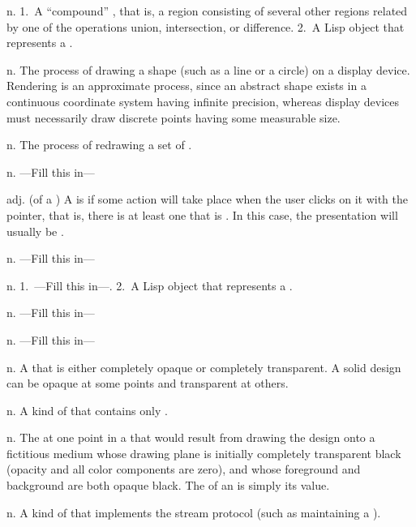 \begin{description}
 {n.} {1.~A ``compound'' , that is, a
region consisting of several other regions related by one of the operations
union, intersection, or difference.  2.~A Lisp object that represents a
.}

 {n.} {The process of drawing a shape (such as a line
or a circle) on a display device.  Rendering is an approximate process, since an
abstract shape exists in a continuous coordinate system having infinite
precision, whereas display devices must necessarily draw discrete points having
some measurable size.}

 {n.} {The process of redrawing a set of .}

 {n.} {---Fill this in---}

 {adj.} {(of a ) A
 is  if some action will take place when the
user clicks on it with the pointer, that is, there is at least one
 that is .  In this case, the
presentation will usually be .}

 {n.} {---Fill this in---}

 {n.} {1.~---Fill this in---.  2.~A Lisp object that
represents a .}

 {n.} {---Fill this in---}

 {n.} {---Fill this in---}

 {n.} {A  that is either completely
opaque or completely transparent.  A solid design can be opaque at some points
and transparent at others.}

 {n.} {A kind of  that contains only
.}

 {n.} {The  at one point in a
 that would result from drawing the design onto a fictitious medium
whose drawing plane is initially completely transparent black (opacity and all
color components are zero), and whose foreground and background are both opaque
black.  The  of an  is simply its value.}

 {n.} {A kind of  that implements the stream
protocol (such as maintaining a ).}


\end{description}

